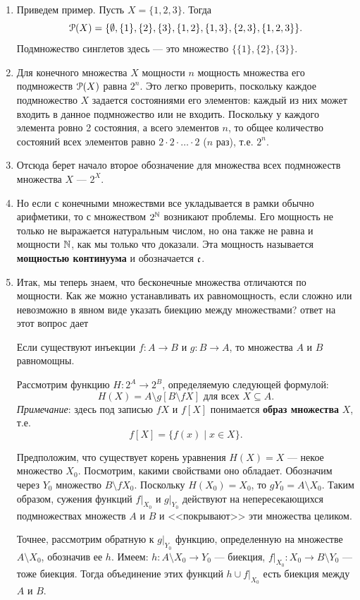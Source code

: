 \begin{enumerate}
\item Приведем пример. Пусть $X=\{1,2,3\}$. Тогда
$$
\mathcal P(X) = \{\emptyset,\{1\},\{2\},\{3\},\{1,2\},\{1,3\},\{2,3\},\{1,2,3\}\}.
$$
Подмножество синглетов здесь --- это множество $\{\{1\},\{2\},\{3\}\}$.

\item Для конечного множества $X$ мощности $n$ мощность множества его подмножеств $\mathcal P(X)$ равна $2^n$. Это легко проверить, поскольку каждое подмножество $X$ задается состояниями его элементов: каждый из них может входить в данное подмножество или не входить. Поскольку у каждого элемента ровно 2 состояния, а всего элементов $n$, то общее количество состояний всех элементов равно $2\cdot 2\cdot\ldots\cdot 2$ ($n$ раз), т.е. $2^n$.
\item Отсюда берет начало второе обозначение для множества всех подмножеств множества $X$ --- $2^X$.
\item Но если с конечными множествми все укладывается в рамки обычно арифметики, то с множеством $2^\mathbb N$ возникают проблемы. Его мощность не только не выражается натуральным числом, но она также не равна и мощности $\mathbb N$, как мы только что доказали. Эта мощность называется \textbf{мощностью континуума} и обозначается $\mathfrak c$.
\item Итак, мы теперь знаем, что бесконечные множества отличаются по мощности. Как же можно устанавливать их равномощность, если сложно или невозможно в явном виде указать биекцию между множествами? ответ на этот вопрос дает
\begin{thrm}
Если существуют инъекции $f:A\to B$ и $g:B\to A$, то множества $A$ и $B$ равномощны.
\end{thrm}
\pf Рассмотрим функцию $H:2^A\to 2^B$, определяемую следующей формулой:
\[H(X)=A\setminus g[B\setminus fX]\mbox{ для всех }X\subseteq A.\]
\textit{Примечание}: здесь под записью $fX$ и $f[X]$ понимается \textbf{образ множества} $X$, т.е.
$$
f[X] = \{f(x)\mid x\in X\}.
$$

Предположим, что существует корень уравнения $H(X)=X$ --- некое множество $X_0$.
Посмотрим, какими свойствами оно обладает. Обозначим через $Y_0$ множество
$B\setminus fX_0$. Поскольку $H(X_0)=X_0$, то $gY_0=A\setminus X_0$. Таким
образом, сужения функций $f|_{X_0}$ и $g|_{Y_0}$ действуют на непересекающихся
подмножествах множеств $A$ и $B$ и <<покрывают>> эти множества
целиком.

Точнее, рассмотрим обратную к $g|_{Y_0}$ функцию, определенную на множестве
$A\setminus X_0$, обозначив ее $h$. Имеем: $h:A\setminus X_0\to Y_0$ ---
биекция, $f|_{X_0}:X_0\to B\setminus Y_0$ --- тоже биекция. Тогда объединение
этих функций $h\cup f|_{X_0}$ есть биекция между $A$ и $B$.


\end{enumerate}
